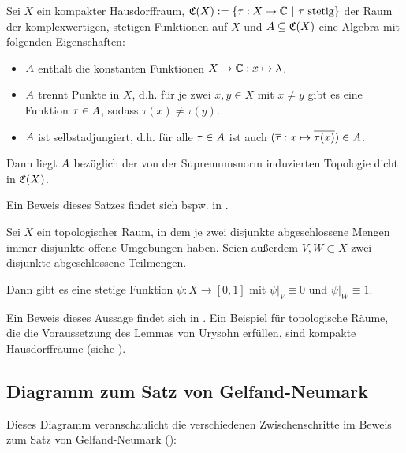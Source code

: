 \begin{satz}\label{satz:SW}
Sei $X$ ein kompakter Hausdorffraum, $\mathfrak{C}(X) :=\{\tau: X \to \mathbb{C} ~|~ \tau \text{ stetig}\}$ der Raum der komplexwertigen, stetigen Funktionen auf $X$ und $A \subseteq \mathfrak{C}(X)$ eine Algebra mit folgenden Eigenschaften:
\begin{itemize}
	\item $A$ enthält die konstanten Funktionen $X \to \mathbb{C}: x \mapsto \lambda$.
	\item $A$ trennt Punkte in $X$, d.h. für je zwei $x, y \in X$ mit $x \neq y$ gibt es eine Funktion $\tau \in A$, sodass $\tau(x) \neq \tau(y)$.
	\item $A$ ist selbstadjungiert, d.h. für alle $\tau \in A$ ist auch $(\overline{\tau}: x \mapsto \overline{\tau(x)}) \in A$.
\end{itemize}
Dann liegt $A$ bezüglich der von der Supremumsnorm induzierten Topologie dicht in $\mathfrak{C}(X)$.
\end{satz}

Ein Beweis dieses Satzes findet sich bspw. in \cite[Satz VIII.4.7]{Werner2011}.


\begin{satz}\label{satz:Ury}
Sei $X$ ein topologischer Raum, in dem je zwei disjunkte abgeschlossene Mengen immer disjunkte offene Umgebungen haben. Seien außerdem $V, W \subset X$ zwei disjunkte abgeschlossene Teilmengen. 

Dann gibt es eine stetige Funktion $\psi: X \to [0,1]$ mit $\psi|_V \equiv 0$ und $\psi|_W \equiv 1$.
\end{satz}

Ein Beweis dieses Aussage findet sich in \cite[S. 136-139]{Jaenich2008}. Ein Beispiel für topologische Räume, die die Voraussetzung des Lemmas von Urysohn erfüllen, sind kompakte Hausdorffräume (siehe \cite[S. 135 (Bemerkung)]{Jaenich2008}).





\newpage
\subsection{Diagramm zum Satz von Gelfand-Neumark}\label{sec:DiagramGN}
Dieses Diagramm veranschaulicht die verschiedenen Zwischenschritte im Beweis zum Satz von Gelfand-Neumark ():

\begin{sideways}
	\begin{minipage}{18cm}
		\fontsize{8pt}{1.5}\selectfont
		
	\end{minipage}
\end{sideways}